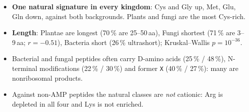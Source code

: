\documentclass[11pt,a4paper]{article}
\newcommand{\amin}{\,aa}
\begin{document}
\begin{table}[H]\centering\footnotesize\setlength{\tabcolsep}{3pt}
\end{table}
\begin{itemize}
\item \textbf{One natural signature in every kingdom}: Cys and Gly up, Met, Glu, Gln down, against both backgrounds. Plants and fungi are the most Cys-rich.
\item \textbf{Length}: Plantae are longest (70\,\% are 25--50\amin), Fungi shortest (71\,\% are 3--9\amin; $r=-0.51$), Bacteria short (26\,\% ultrashort); Kruskal--Wallis $p=10^{-36}$.
\item Bacterial and fungal peptides often carry D-amino acids (25\,\% / 48\,\%), N-terminal modifications (22\,\% / 30\,\%) and former \texttt{X} (40\,\% / 27\,\%): many are nonribosomal products.
\item Against non-AMP peptides the natural classes are \emph{not} cationic: Arg is depleted in all four and Lys is not enriched.
\end{itemize}
\end{document}
